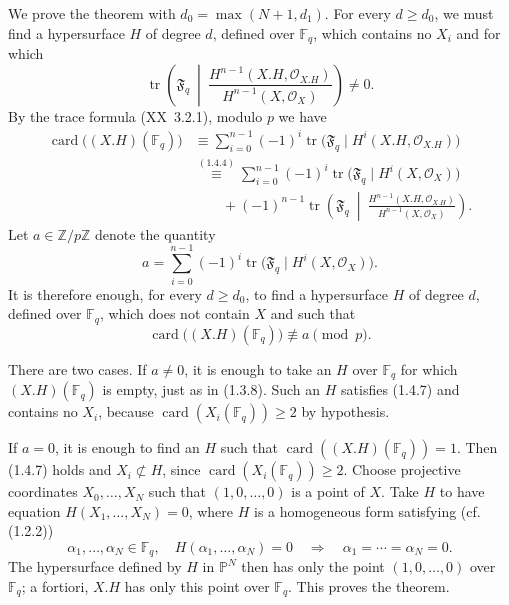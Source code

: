 We prove the theorem with $d_0=\max(N+1,d_1)$.  For every $d\geq d_0$,
we must find a hypersurface $H$ of degree $d$, defined over $\mathbb F_q$,
which contains no $X_i$ and for which
\begin{equation}\tag{1.4.5}
\operatorname{tr}\!\left(\mathfrak F_q\ \middle|\
\frac{H^{n-1}(X.H,\mathcal O_{X.H})}
     {H^{n-1}(X,\mathcal O_X)}\right)\ne0.
\end{equation}
By the trace formula (XX~3.2.1), modulo $p$ we have
\begin{equation}\tag{1.4.6}
\begin{aligned}
\operatorname{card}\bigl((X.H)(\mathbb F_q)\bigr)
&\equiv\sum_{i=0}^{n-1}(-1)^i
 \operatorname{tr}\bigl(\mathfrak F_q\mid
 H^i(X.H,\mathcal O_{X.H})\bigr)\\
&\stackrel{(1.4.4)}{\equiv}
 \sum_{i=0}^{n-1}(-1)^i
 \operatorname{tr}\bigl(\mathfrak F_q\mid H^i(X,\mathcal O_X)\bigr)\\
&\qquad+(-1)^{n-1}\operatorname{tr}\!\left(\mathfrak F_q\ \middle|\
 \frac{H^{n-1}(X.H,\mathcal O_{X.H})}
      {H^{n-1}(X,\mathcal O_X)}\right).
\end{aligned}
\end{equation}
Let $a\in\mathbb Z/p\mathbb Z$ denote the quantity
\[
a=\sum_{i=0}^{n-1}(-1)^i
\operatorname{tr}\bigl(\mathfrak F_q\mid H^i(X,\mathcal O_X)\bigr).
\]
It is therefore enough, for every $d\geq d_0$, to find a hypersurface $H$
of degree $d$, defined over $\mathbb F_q$, which does not contain $X$ and
such that
\begin{equation}\tag{1.4.7}
\operatorname{card}\bigl((X.H)(\mathbb F_q)\bigr)\not\equiv a\pmod p.
\end{equation}

There are two cases.  If $a\ne0$, it is enough to take an $H$ over
$\mathbb F_q$ for which $(X.H)(\mathbb F_q)$ is empty, just as in (1.3.8).
Such an $H$ satisfies (1.4.7) and contains no $X_i$, because
$\operatorname{card}(X_i(\mathbb F_q))\geq2$ by hypothesis.

If $a=0$, it is enough to find an $H$ such that
$\operatorname{card}((X.H)(\mathbb F_q))=1$.  Then (1.4.7) holds and
$X_i\not\subset H$, since $\operatorname{card}(X_i(\mathbb F_q))\geq2$.
Choose projective coordinates $X_0,\dots,X_N$ such that $(1,0,\dots,0)$ is
a point of $X$.  Take $H$ to have equation $H(X_1,\dots,X_N)=0$, where $H$
is a homogeneous form satisfying (cf. (1.2.2))
\begin{equation}\tag{1.4.8}
\alpha_1,\dots,\alpha_N\in\mathbb F_q,\quad
H(\alpha_1,\dots,\alpha_N)=0
\quad\Longrightarrow\quad
\alpha_1=\cdots=\alpha_N=0.
\end{equation}
The hypersurface defined by $H$ in $\mathbb P^N$ then has only the point
$(1,0,\dots,0)$ over $\mathbb F_q$; a fortiori, $X.H$ has only this point
over $\mathbb F_q$.  This proves the theorem.

